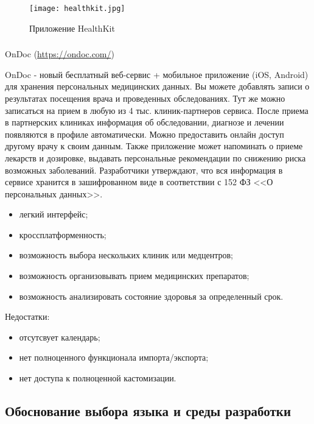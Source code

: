 \begin{figure}[ht]
\centering
  \texttt{[image: healthkit.jpg]}  
  \caption{ Приложение HealthKit }
  \label{fig:domain:manual_structure:credit_healthkit}
\end{figure}

\subsubsection{}OnDoc (\url{https://ondoc.com/}) 

OnDoc - новый бесплатный веб-сервис + мобильное приложение (iOS, Android) для хранения персональных медицинских данных. Вы можете добавлять записи о результатах посещения врача и проведенных обследованиях. Тут же можно записаться на прием в любую из 4 тыс. клиник-партнеров сервиса. После приема в партнерских клиниках информация об обследовании, диагнозе и лечении появляются в профиле автоматически. Можно предоставить онлайн доступ другому врачу к своим данным. Также приложение может напоминать о приеме лекарств и дозировке, выдавать персональные рекомендации по снижению риска возможных заболеваний. Разработчики утверждают, что вся информация в сервисе хранится в зашифрованном виде в соответствии с 152 ФЗ <<О персональных данных>>.

\begin{itemize}
  \item легкий интерфейс;
  \item кроссплатформенность;
  \item возможность выбора нескольких клиник или медцентров;
  \item возможность организовывать прием медицинских препаратов;
  \item возможность анализировать состояние здоровья за определенный срок.
\end{itemize}
Недостатки:
\begin{itemize}
  \item отсутсвует календарь;
  \item нет полноценного функционала импорта/экспорта;
  \item нет доступа к полноценной кастомизации.
\end{itemize}


\subsection{Обоснование выбора языка и среды разработки} %
\label{sub:domain:existing_language}


